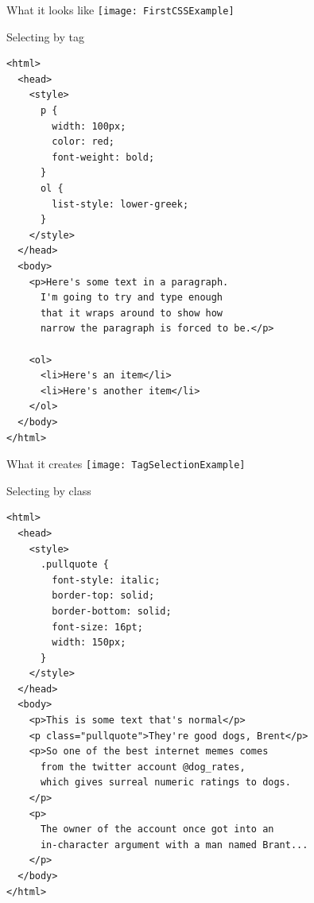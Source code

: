 \documentclass[notes]{beamer}
\begin{document}
\begin{frame}{What it looks like}
  \texttt{[image: FirstCSSExample]}
\end{frame}

\begin{frame}[fragile]{Selecting by tag}
  \begin{verbatim}
<html>
  <head>
    <style>
      p {
        width: 100px;
        color: red;
        font-weight: bold;
      }
      ol {
        list-style: lower-greek;
      }
    </style>
  </head>
  <body>
    <p>Here's some text in a paragraph.
      I'm going to try and type enough
      that it wraps around to show how
      narrow the paragraph is forced to be.</p>

    <ol>
      <li>Here's an item</li>
      <li>Here's another item</li>
    </ol>
  </body>
</html>
  \end{verbatim}
\end{frame}

\begin{frame}{What it creates}
  \texttt{[image: TagSelectionExample]}
\end{frame}

\begin{frame}[fragile]{Selecting by class}
  \begin{verbatim}
<html>
  <head>
    <style>
      .pullquote {
        font-style: italic;
        border-top: solid;
        border-bottom: solid;
        font-size: 16pt;
        width: 150px;
      }
    </style>
  </head>
  <body>
    <p>This is some text that's normal</p>
    <p class="pullquote">They're good dogs, Brent</p>
    <p>So one of the best internet memes comes
      from the twitter account @dog_rates,
      which gives surreal numeric ratings to dogs.
    </p>
    <p>
      The owner of the account once got into an
      in-character argument with a man named Brant...
    </p>
  </body>
</html>    
\end{verbatim}

\end{frame}
\end{document}
